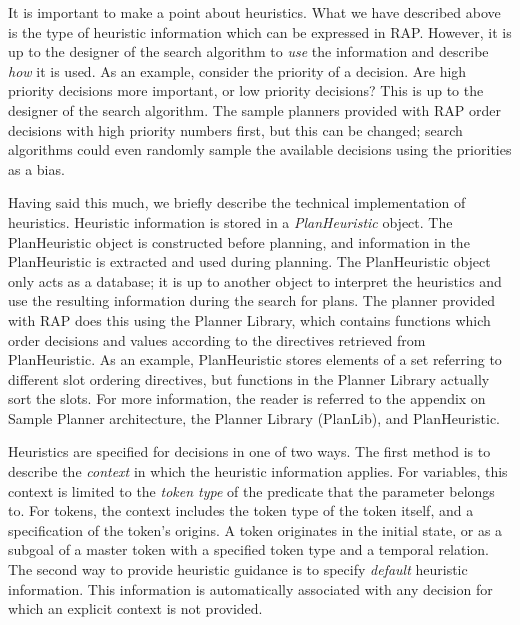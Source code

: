 It is important to make a point about heuristics.  What we have
described above is the type of heuristic information which can be
expressed in RAP.  However, it is up to the designer of the search
algorithm to {\em use} the information and describe {\em how} it is
used.  As an example, consider the priority of a decision.  Are high
priority decisions more important, or low priority decisions?  This is
up to the designer of the search algorithm.  The sample planners
provided with RAP order decisions with high priority numbers first,
but this can be changed; search algorithms could even randomly sample
the available decisions using the priorities as a bias.  

Having said this much, we briefly describe the technical
implementation of heuristics.  Heuristic information is stored in a
{\em PlanHeuristic} object.  The PlanHeuristic object is constructed
before planning, and information in the PlanHeuristic is extracted and
used during planning.  The PlanHeuristic object only acts as a
database; it is up to another object to interpret the heuristics and
use the resulting information during the search for plans.  The
planner provided with RAP does this using the Planner Library, which
contains functions which order decisions and values according to the
directives retrieved from PlanHeuristic.  As an example, PlanHeuristic
stores elements of a set referring to different slot ordering
directives, but functions in the Planner Library actually sort the
slots.  For more information, the reader is referred to the appendix
on Sample Planner architecture, the Planner Library (PlanLib), and
PlanHeuristic.

Heuristics are specified for decisions in one of two ways.
The first method is to describe the {\em context} in which the
heuristic information applies.  For variables, this context is limited
to the {\em token type} of the predicate that the parameter belongs
to.  For tokens, the context includes the token type of the token
itself, and a specification of the token's origins.  A token
originates in the initial state, or as a subgoal of a master token
with a specified token type and a temporal relation.  The second way
to provide heuristic guidance is to specify {\em default} heuristic
information.  This information is automatically associated with any
decision for which an explicit context is not provided.

